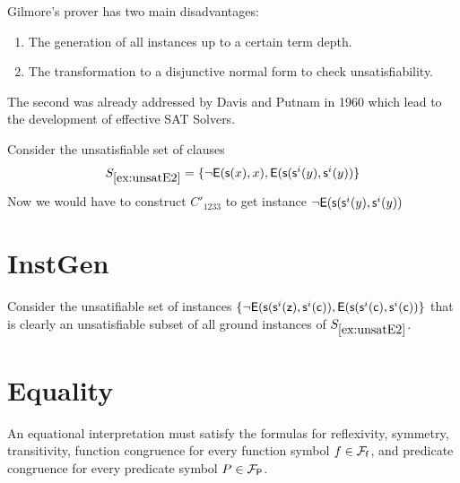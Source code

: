 Gilmore's prover has two main disadvantages:
\begin{enumerate}
	\item The generation of all instances up to a certain term depth.
	\item The transformation to a disjunctive normal form to check unsatisfiability.
\end{enumerate}

The second was already addressed by Davis and Putnam in 1960
which lead to the development of effective SAT Solvers.

\begin{example}\label{ex:unsatE2}
	Consider the unsatisfiable set of clauses 
	\[ 
	S_{\ref{ex:unsatE2}} = 
	\{
	\lnot{\mathsf{E}}({\mathsf s}(x),x), {\mathsf{E}}({\mathsf s}({\mathsf s}^i(y), {\mathsf s}^i(y)) 
	\} 
	\]
	Now we would have to construct $C'_{1233}$ to get instance $\lnot{\mathsf{E}}({\mathsf s}({\mathsf s}^i(y), {\mathsf s}^i(y))$
\end{example}

\section{InstGen}

\begin{example}\label{ex:unsat2}
Consider the unsatifiable set of instances
$ 
\{
\lnot{\mathsf{E}}({\mathsf s}({\mathsf s}^i({\mathsf z}), {\mathsf s}^i({\mathsf c})), {\mathsf{E}}({\mathsf s}({\mathsf s}^i({\mathsf c}), {\mathsf s}^i({\mathsf c})) 
\} 
$
that is clearly an unsatisfiable subset of all ground instances of $S_{\ref{ex:unsatE2}}$.

\end{example}




\section{Equality}



	An equational interpretation must satisfy the formulas for reflexivity, symmetry, transitivity, 
	function congruence for every function symbol $f\in{{\mathcal F}_{\mathsf f}}$, 
	and predicate congruence for every predicate symbol $P\in{{\mathcal F}_{\mathsf P}}$.

%

